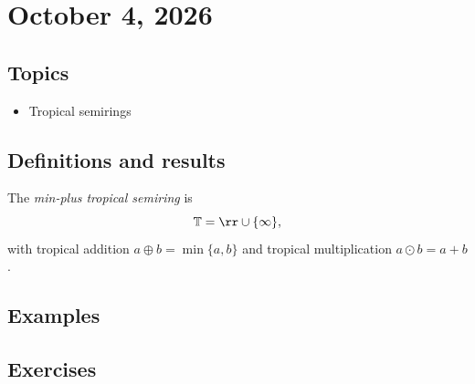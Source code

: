 \section{October 4, 2026}

\subsection{Topics}

\begin{itemize}
    \item Tropical semirings
\end{itemize}

\subsection{Definitions and results}

\begin{defin}
    The \textit{min-plus tropical semiring} is
    \[\mathbb T = \rr \cup \{\infty\},\]
    with tropical addition $a \oplus b = \min\{a,b\}$ and 
    tropical multiplication $a \odot b = a+b$.
\end{defin}

\subsection{Examples}


\subsection{Exercises}
